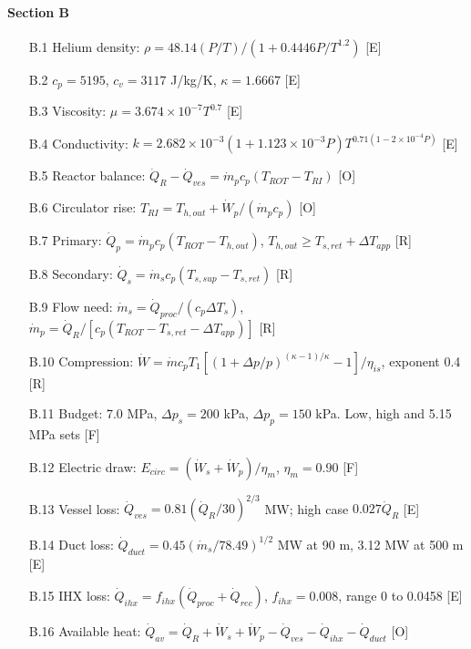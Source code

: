 \paragraph{Section B}
\begin{enumerate}[leftmargin=1.4cm,itemsep=0pt,topsep=2pt,parsep=0pt]\small
\item[B.1] Helium density: $\rho=48.14(P/T)/(1+0.4446P/T^{1.2})$ {\footnotesize [E]}
\item[B.2] $c_p=5195$, $c_v=3117$ J/kg/K, $\kappa=1.6667$ {\footnotesize [E]}
\item[B.3] Viscosity: $\mu=3.674\times10^{-7}T^{0.7}$ {\footnotesize [E]}
\item[B.4] Conductivity: $k=2.682\times10^{-3}(1+1.123\times10^{-3}P)T^{0.71(1-2\times10^{-4}P)}$ {\footnotesize [E]}
\item[B.5] Reactor balance: $\dot Q_R-\dot Q_{ves}=\dot m_pc_p(T_{ROT}-T_{RI})$ {\footnotesize [O]}
\item[B.6] Circulator rise: $T_{RI}=T_{h,out}+\dot W_p/(\dot m_pc_p)$ {\footnotesize [O]}
\item[B.7] Primary: $\dot Q_p=\dot m_pc_p(T_{ROT}-T_{h,out})$, $T_{h,out}\ge T_{s,ret}+\Delta T_{app}$ {\footnotesize [R]}
\item[B.8] Secondary: $\dot Q_s=\dot m_sc_p(T_{s,sup}-T_{s,ret})$ {\footnotesize [R]}
\item[B.9] Flow need: $\dot m_s=\dot Q_{proc}/(c_p\Delta T_s)$, $\dot m_p=\dot Q_R/[c_p(T_{ROT}-T_{s,ret}-\Delta T_{app})]$ {\footnotesize [R]}
\item[B.10] Compression: $\dot W=\dot mc_pT_1[(1+\Delta p/p)^{(\kappa-1)/\kappa}-1]/\eta_{is}$, exponent 0.4 {\footnotesize [R]}
\item[B.11] Budget: 7.0 MPa, $\Delta p_s=200$ kPa, $\Delta p_p=150$ kPa. Low, high and 5.15 MPa sets {\footnotesize [F]}
\item[B.12] Electric draw: $E_{circ}=(\dot W_s+\dot W_p)/\eta_m$, $\eta_m=0.90$ {\footnotesize [F]}
\item[B.13] Vessel loss: $\dot Q_{ves}=0.81(\dot Q_R/30)^{2/3}$ MW; high case $0.027\dot Q_R$ {\footnotesize [E]}
\item[B.14] Duct loss: $\dot Q_{duct}=0.45(\dot m_s/78.49)^{1/2}$ MW at 90 m, 3.12 MW at 500 m {\footnotesize [E]}
\item[B.15] IHX loss: $\dot Q_{ihx}=f_{ihx}(\dot Q_{proc}+\dot Q_{rec})$, $f_{ihx}=0.008$, range 0 to 0.0458 {\footnotesize [E]}
\item[B.16] Available heat: $\dot Q_{av}=\dot Q_R+\dot W_s+\dot W_p-\dot Q_{ves}-\dot Q_{ihx}-\dot Q_{duct}$ {\footnotesize [O]}

\end{enumerate}
